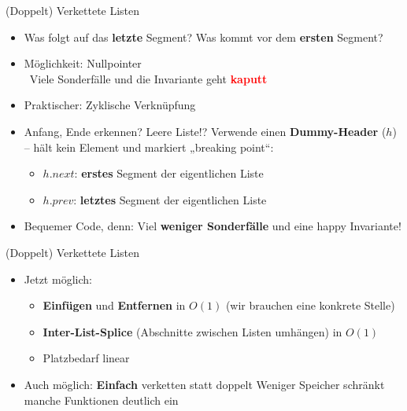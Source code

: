 \begin{frame}{(Doppelt) Verkettete Listen}
	\begin{itemize}
		\item Was folgt auf das \textbf{letzte} Segment? Was kommt vor dem \textbf{ersten} Segment?
		\pause
		\item Möglichkeit: Nullpointer \\
		\pause
		\hanging \Cons \ Viele Sonderfälle und die Invariante geht \textcolor{red}{\textbf{kaputt}} \frownie
		\pause
		\item Praktischer: Zyklische Verknüpfung
		\pause
		\item Anfang, Ende erkennen? Leere Liste!?
		\pause
		\implitem Verwende einen \textbf{Dummy-Header} ($h$) – hält kein Element und markiert „breaking point“:
		\pause
		\begin{itemize}
			\item $h.next$: \textbf{erstes} Segment der eigentlichen Liste
			\item $h.prev$: \textbf{letztes} Segment der eigentlichen Liste
		\end{itemize}
		\pause
		\item[\Pros] Bequemer Code, denn: Viel \textbf{weniger Sonderfälle} und eine happy Invariante! \smiley
	\end{itemize}
\end{frame}

\begin{frame}{(Doppelt) Verkettete Listen}
	\begin{itemize}
		\item Jetzt möglich:
		\pause
		\begin{itemize}
			\item \textbf{Einfügen} und \textbf{Entfernen} in $O(1)$ (wir brauchen eine konkrete Stelle)
			\pause 
			\item \textbf{Inter-List-Splice} (Abschnitte zwischen Listen umhängen) in $O(1)$
			\pause
			\item Platzbedarf linear
		\end{itemize}
		\pause
		\item Auch möglich: \textbf{Einfach} verketten statt doppelt \impl Weniger Speicher \newline \impl schränkt manche Funktionen deutlich ein
	\end{itemize}
\end{frame}


